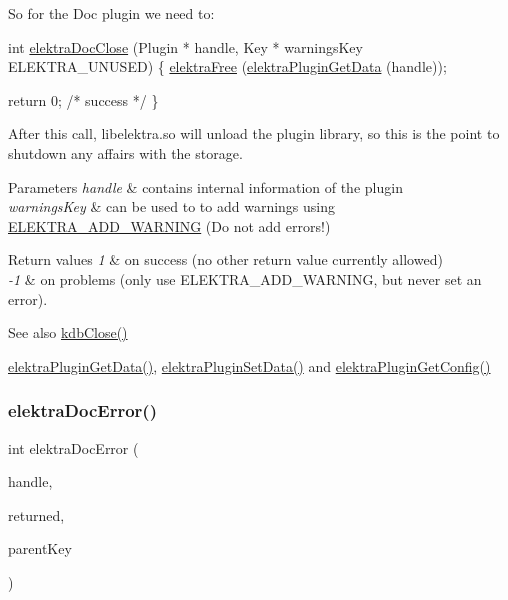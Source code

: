 So for the Doc plugin we need to\+:


\begin{DoxyCodeInclude}
\textcolor{keywordtype}{int} \hyperlink{group__plugin_ga1236aefe5b2baf8b7bf636ba5aa9ea29}{elektraDocClose} (Plugin * handle, Key * warningsKey ELEKTRA\_UNUSED)
\{
        \hyperlink{internal_8c_a7f572149d2e0bfe18023a6ac969f195c}{elektraFree} (\hyperlink{group__plugin_gaafcf3216b46292f222b8cc7828b4dd20}{elektraPluginGetData} (handle));

        \textcolor{keywordflow}{return} 0; \textcolor{comment}{/* success */}
\}
\end{DoxyCodeInclude}
 After this call, libelektra.\+so will unload the plugin library, so this is the point to shutdown any affairs with the storage.


\begin{DoxyParams}{Parameters}
{\em handle} & contains internal information of the plugin \\
\hline
{\em warnings\+Key} & can be used to to add warnings using \hyperlink{group__plugin_ga3da3bdb0f41710adda9eee3d7adac9ff}{E\+L\+E\+K\+T\+R\+A\+\_\+\+A\+D\+D\+\_\+\+W\+A\+R\+N\+I\+NG} (Do not add errors!)\\
\hline
\end{DoxyParams}

\begin{DoxyRetVals}{Return values}
{\em 1} & on success (no other return value currently allowed)\\
\hline
{\em -\/1} & on problems (only use E\+L\+E\+K\+T\+R\+A\+\_\+\+A\+D\+D\+\_\+\+W\+A\+R\+N\+I\+NG, but never set an error).\\
\hline
\end{DoxyRetVals}
\begin{DoxySeeAlso}{See also}
\hyperlink{group__kdb_gadb54dc9fda17ee07deb9444df745c96f}{kdb\+Close()} 

\hyperlink{group__plugin_gaafcf3216b46292f222b8cc7828b4dd20}{elektra\+Plugin\+Get\+Data()}, \hyperlink{group__plugin_gaf4b941a52ff55d0ca2a9158d90208ef2}{elektra\+Plugin\+Set\+Data()} and \hyperlink{group__plugin_ga644bead796506c172817724051c977c9}{elektra\+Plugin\+Get\+Config()} 
\end{DoxySeeAlso}
\mbox{\label{group__plugin_gad74b35f558ac7c3262f6069c5c47dc79}} 
\subsubsection{\texorpdfstring{elektra\+Doc\+Error()}{elektraDocError()}}
{\footnotesize\ttfamily int elektra\+Doc\+Error (\begin{DoxyParamCaption}\item[{Plugin $\ast$}]{handle,  }\item[{Key\+Set $\ast$}]{returned,  }\item[{Key $\ast$}]{parent\+Key }\end{DoxyParamCaption})}



